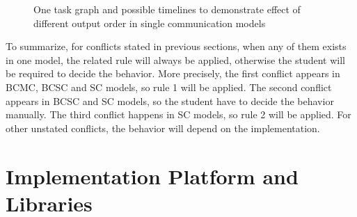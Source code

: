 \documentclass[msc,deptreport, cs]{infthesis}
\begin{document}
\begin{figure}[!htb]
  \centering
   \hspace{0.5em}
   \hspace{0.5em}
  \caption{One task graph and possible timelines to demonstrate effect of different output order in single communication models}
  \label{fig:conflict4}
\end{figure}

To summarize, for conflicts stated in previous sections, when any of them exists in one model, the related rule will always be applied, otherwise the student will be required to decide the behavior. More precisely, the first conflict appears in BCMC, BCSC and SC models, so rule 1 will be applied. The second conflict appears in BCSC and SC models, so the student have to decide the behavior manually. The third conflict happens in SC models, so rule 2 will be applied. For other unstated conflicts, the behavior will depend on the implementation.

\section{Implementation Platform and Libraries}
\end{document}
